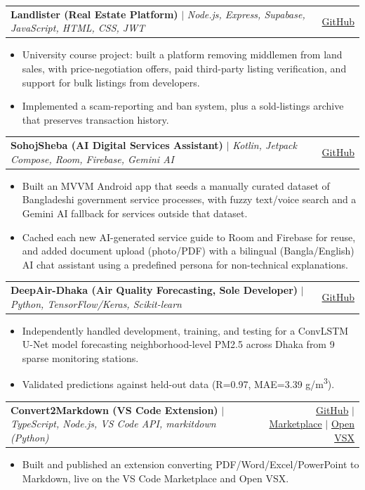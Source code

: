 \documentclass[letterpaper,11pt]{article}
\makeatletter
\newcommand{\resumeItem}[1]{
  \item\small{
    {#1 \vspace{-2pt}}
  }
}
\newcommand{\resumeProjectHeading}[2]{
    \item
    \begin{tabularx}{\linewidth}{@{}X@{\hspace{10pt}}r@{}}
      {\small#1} & #2 \\
    \end{tabularx}\vspace{-5pt}
}
\newcommand{\resumeItemListStart}{\begin{itemize}[noitemsep, topsep=1pt, parsep=0pt, partopsep=0pt]}
\newcommand{\resumeItemListEnd}{\end{itemize}\vspace{-3pt}}
\makeatother
\begin{document}
      \resumeProjectHeading
          {\textbf{Landlister (Real Estate Platform)} $|$ \emph{Node.js, Express, Supabase, JavaScript, HTML, CSS, JWT}}{\href{https://github.com/Refayatul/landlister}{GitHub}}
          \resumeItemListStart
            \resumeItem{University course project: built a platform removing middlemen from land sales, with price-negotiation offers, paid third-party listing verification, and support for bulk listings from developers.}
            \resumeItem{Implemented a scam-reporting and ban system, plus a sold-listings archive that preserves transaction history.}
          \resumeItemListEnd

      \resumeProjectHeading
          {\textbf{SohojSheba (AI Digital Services Assistant)} $|$ \emph{Kotlin, Jetpack Compose, Room, Firebase, Gemini AI}}{\href{https://github.com/Refayatul/SohojSheba}{GitHub}}
          \resumeItemListStart
            \resumeItem{Built an MVVM Android app that seeds a manually curated dataset of Bangladeshi government service processes, with fuzzy text/voice search and a Gemini AI fallback for services outside that dataset.}
            \resumeItem{Cached each new AI-generated service guide to Room and Firebase for reuse, and added document upload (photo/PDF) with a bilingual (Bangla/English) AI chat assistant using a predefined persona for non-technical explanations.}
          \resumeItemListEnd

      \resumeProjectHeading
          {\textbf{DeepAir-Dhaka (Air Quality Forecasting, Sole Developer)} $|$ \emph{Python, TensorFlow/Keras, Scikit-learn}}{\href{https://github.com/Paromita22/DeepAir}{GitHub}}
          \resumeItemListStart
            \resumeItem{Independently handled development, training, and testing for a ConvLSTM U-Net model forecasting neighborhood-level PM2.5 across Dhaka from 9 sparse monitoring stations.}
            \resumeItem{Validated predictions against held-out data (R=0.97, MAE=3.39 \textmu g/m\textsuperscript{3}).}
          \resumeItemListEnd

      \resumeProjectHeading
          {\textbf{Convert2Markdown (VS Code Extension)} $|$ \emph{TypeScript, Node.js, VS Code API, markitdown (Python)}}{\href{https://github.com/Refayatul/vscode-markitdown}{GitHub} $|$ \href{https://marketplace.visualstudio.com/items?itemName=refayatul.vscode-markitdown}{Marketplace} $|$ \href{https://open-vsx.org/extension/refayatul/vscode-markitdown}{Open VSX}}
          \resumeItemListStart
            \resumeItem{Built and published an extension converting PDF/Word/Excel/PowerPoint to Markdown, live on the VS Code Marketplace and Open VSX.}
          \resumeItemListEnd
\end{document}

